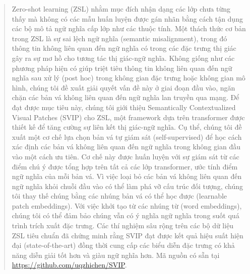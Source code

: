 \begin{abstract}
Zero-shot learning (ZSL) nhằm mục đích nhận dạng các lớp chưa từng thấy mà không có các mẫu huấn luyện được gán nhãn bằng cách tận dụng các bộ mô tả ngữ nghĩa cấp lớp như các thuộc tính. Một thách thức cơ bản trong ZSL là sự sai lệch ngữ nghĩa (semantic misalignment), trong đó thông tin không liên quan đến ngữ nghĩa có trong các đặc trưng thị giác gây ra sự mơ hồ cho tương tác thị giác-ngữ nghĩa. Không giống như các phương pháp hiện có giúp triệt tiêu thông tin không liên quan đến ngữ nghĩa sau xử lý (post hoc) trong không gian đặc trưng hoặc không gian mô hình, chúng tôi đề xuất giải quyết vấn đề này ở giai đoạn đầu vào, ngăn chặn các bản vá không liên quan đến ngữ nghĩa lan truyền qua mạng. Để đạt được mục tiêu này, chúng tôi giới thiệu Semantically Contextualized Visual Patches (SVIP) cho ZSL, một framework dựa trên transformer được thiết kế để tăng cường sự liên kết thị giác-ngữ nghĩa. Cụ thể, chúng tôi đề xuất một cơ chế lựa chọn bản vá tự giám sát (self-supervised) để học cách xác định các bản vá không liên quan đến ngữ nghĩa trong không gian đầu vào một cách ưu tiên. Cơ chế này được huấn luyện với sự giám sát từ các điểm chú ý được tổng hợp trên tất cả các lớp transformer, ước tính điểm ngữ nghĩa của mỗi bản vá. Vì việc loại bỏ các bản vá không liên quan đến ngữ nghĩa khỏi chuỗi đầu vào có thể làm phá vỡ cấu trúc đối tượng, chúng tôi thay thế chúng bằng các nhúng bản vá có thể học được (learnable patch embeddings). Với việc khởi tạo từ các nhúng từ (word embeddings), chúng tôi có thể đảm bảo chúng vẫn có ý nghĩa ngữ nghĩa trong suốt quá trình trích xuất đặc trưng. Các thí nghiệm sâu rộng trên các bộ dữ liệu ZSL tiêu chuẩn đã chứng minh rằng SVIP đạt được kết quả hiệu suất hiện đại (state-of-the-art) đồng thời cung cấp các biểu diễn đặc trưng có khả năng diễn giải tốt hơn và giàu ngữ nghĩa hơn. Mã nguồn có sẵn tại \url{https://github.com/uqzhichen/SVIP}.
\end{abstract}
